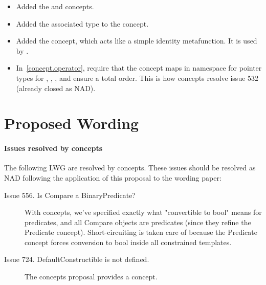 \documentclass[american,twoside]{book}
\begin{document}
\begin{titlepage}
\begin{itemize}
\item Added the  and 
  concepts. 

\item Added the  associated type to the
   concept.

\item Added the  concept, which acts like a simple
  identity metafunction. It is used by .

\item In~\ref{concept.operator}, require that the concept maps in
  namespace  for pointer types for ,
  , , and
   ensure a total order. This is how concepts
  resolve issue 532 (already closed as NAD).
\end{itemize}

\end{titlepage}

\section*{Proposed Wording}
\paragraph*{Issues resolved by concepts}
The following LWG are resolved by concepts. These issues should be
resolved as NAD following the application of this proposal to the
wording paper:
\begin{description}
\item[Issue 556. Is Compare a BinaryPredicate?] With concepts, we've
  specified exactly what "convertible to bool" means for predicates,
  and all Compare objects are predicates (since they refine the
  Predicate concept). Short-circuiting is taken care of because the
  Predicate concept forces conversion to bool inside all constrained
  templates.
\item[Issue 724. DefaultConstructible is not defined.]
The concepts proposal provides a  concept.
\end{description}

\pagestyle{fancy}
\fancyhead[LE,RO]{\textbf{\rightmark}}
\fancyhead[RE]{\textbf{\leftmark\hspace{1em}\thepage}}
\fancyhead[LO]{\textbf{\thepage\hspace{1em}\leftmark}}
\end{document}

